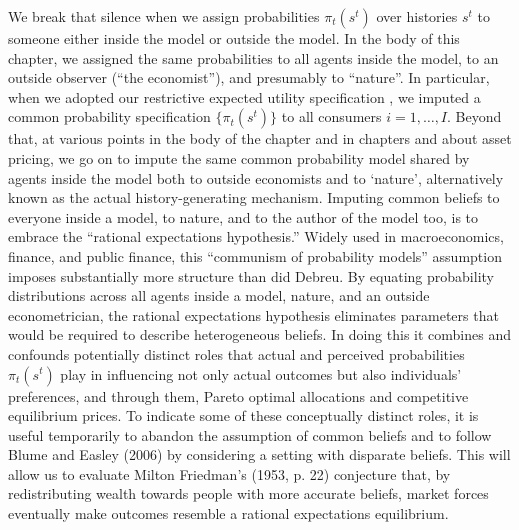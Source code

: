 %
We break that silence %
when we assign  probabilities $\pi_t(s^t)$ over histories $s^t$ to someone either inside the model or outside the model.
In the body of this chapter, we  assigned the same probabilities to all agents inside the model, to an outside observer (``the economist''),
and presumably to ``nature''.  In particular, when we  adopted our restrictive expected utility specification , we
 imputed a common probability specification $\{\pi_t(s^t)\}$   to all consumers $i=1, \ldots, I$.  Beyond that,
 at various points in the body of the  chapter and  in  chapters  and  about asset pricing,
 we   go on to impute the same common probability model shared by agents inside the model  both to outside economists and to   `nature', alternatively known as the
actual history-generating mechanism.  Imputing common beliefs to everyone inside a model, to nature,
and to the author of the model too, is to embrace the  ``rational expectations hypothesis.''
%
%
Widely used in macroeconomics, finance, and public finance, this ``communism of probability models'' assumption imposes substantially more structure than did Debreu.
By equating probability distributions
 across all agents inside a model,  nature, and  an outside econometrician, the rational expectations hypothesis eliminates parameters that would
 be required to describe heterogeneous beliefs. In doing this it combines and confounds  potentially distinct roles that actual and  perceived probabilities  $\pi_t(s^t)$ play in influencing not only actual outcomes but also   individuals'
preferences, and through them, Pareto optimal allocations and competitive equilibrium prices.
To indicate some of these conceptually distinct roles, it is useful temporarily to abandon the assumption of common beliefs and to follow
Blume and Easley (2006) by considering
a setting with disparate beliefs.  This will  allow us to evaluate  Milton Friedman's (1953, p. 22) conjecture
that, by redistributing wealth towards people with more accurate beliefs, market forces eventually make outcomes resemble
 a rational expectations equilibrium. %


